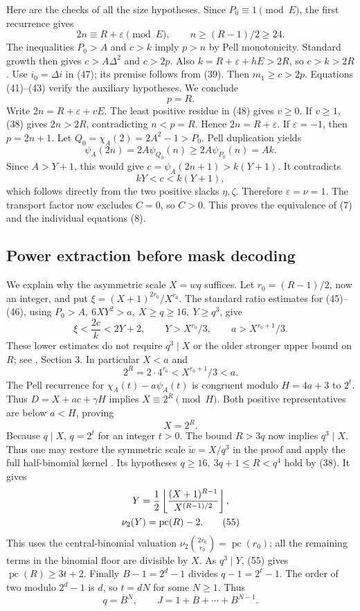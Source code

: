 \documentclass[11pt,a4paper]{article}
\theoremstyle{definition}
\theoremstyle{remark}
\newcommand{\pc}{\operatorname{pc}}
\newcommand{\val}{\nu_2}
\begin{document}
Here are the checks of all the size hypotheses.
Since \(P_0\equiv1\pmod E\), the first recurrence gives
\[
 2n\equiv R+\varepsilon\pmod E,\qquad
 n\ge(R-1)/2\ge24. \tag{48}
\]
The inequalities \(P_0>A\) and \(c>k\) imply \(p>n\) by
Pell monotonicity. Standard growth then gives
\(c>A\Delta^2\) and \(c>2p\). Also
\(k=R+\varepsilon+hE>2R\), so \(c>k>2R\).
Use \(i_0=\Delta i\) in (47); its premise follows from (39).
Then \(m_1\ge c>2p\). Equations (41)--(43) verify the auxiliary
hypotheses. We conclude
\[
 p=R. \tag{49}
\]
Write \(2n=R+\varepsilon+vE\). The least positive residue in (48)
gives \(v\ge0\). If \(v\ge1\), (38) gives \(2n>2R\),
contradicting \(n<p=R\). Hence \(2n=R+\varepsilon\).
If \(\varepsilon=-1\), then \(p=2n+1\).
Let \(Q_0=\chi_A(2)=2A^2-1>P_0\). Pell duplication yields
\[
 \psi_A(2n)=2A\psi_{Q_0}(n)\ge2A\psi_{P_0}(n)=Ak. \tag{50}
\]
Since \(A>Y+1\), this would give
\(c=\psi_A(2n+1)>k(Y+1)\). It contradicts
\[
 kY<c<k(Y+1), \tag{51}
\]
which follows directly from the two positive slacks \(\eta,\zeta\).
Therefore \(\varepsilon=\nu=1\). The transport factor now excludes
\(C=0\), so \(C>0\).
This proves the equivalence of (7) and the individual equations (8).

\subsection{Power extraction before mask decoding}
We explain why the asymmetric scale \(X=wq\) suffices.
Let \(r_0=(R-1)/2\), now an integer, and put
\(\xi=(X+1)^{2r_0}/X^{r_0}\).
The standard ratio estimates for (45)--(46), using
\(P_0>A,\ 6XY^2>a,\ X\ge q\ge16,\ Y\ge q^3\), give
\[
 \xi<\frac{2c}{k}<2Y+2,\qquad
 Y>X^{r_0}/3,\qquad a>X^{r_0+1}/3. \tag{52}
\]
These lower estimates do not require \(q^3\mid X\) or the older
stronger upper bound on \(R\); see \cite{asymmetric}, Section 3.
In particular \(X<a\) and
\[
 2^R=2\cdot4^{r_0}<X^{r_0+1}/3<a. \tag{53}
\]
The Pell recurrence for \(\chi_A(t)-a\psi_A(t)\) is congruent
modulo \(H=4a+3\) to \(2^t\). Thus \(D=X+ac+\gamma H\)
implies \(X\equiv2^R\pmod H\). Both positive representatives
are below \(a<H\), proving
\[
 X=2^R. \tag{54}
\]
Because \(q\mid X\), \(q=2^t\) for an integer \(t>0\).
The bound \(R>3q\) now implies \(q^3\mid X\).
Thus one may restore the symmetric scale \(\widetilde w=X/q^3\)
in the proof and apply the full half-binomial kernel
\cite{halfbinomial}. Its hypotheses
\(q\ge16,\ 3q+1\le R<q^4\) hold by (38).
It gives
\begin{gather}
 Y=\frac12\left\lfloor
             \frac{(X+1)^{R-1}}{X^{(R-1)/2}}\right\rfloor,\notag\\
 \val(Y)=\pc(R)-2. \tag{55}
\end{gather}
This uses the central-binomial valuation
\(\nu_2\binom{2r_0}{r_0}=\pc(r_0)\);
all the remaining terms in the binomial floor are divisible by \(X\).
As \(q^3\mid Y\), (55) gives \(\pc(R)\ge3t+2\).
Finally \(B-1=2^d-1\) divides \(q-1=2^t-1\).
The order of two modulo \(2^d-1\) is \(d\), so \(t=dN\)
for some \(N\ge1\). Thus
\[
 q=B^N,\qquad J=1+B+\cdots+B^{N-1}. \tag{56}
\]
\end{document}
